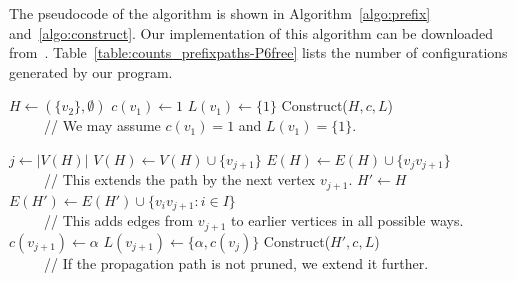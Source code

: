 \documentclass[11pt]{article}
\begin{document}
The pseudocode of the algorithm is shown in Algorithm~\ref{algo:prefix} and~\ref{algo:construct}. 
Our implementation of this algorithm can be downloaded from~\cite{listcriticalpfree-site}. 
Table~\ref{table:counts_prefixpaths-P6free} lists the number of configurations generated by our program.


\begin{algorithm}[h]
\caption{Generate propagation paths and lists}
\label{algo:prefix}
  \begin{algorithmic}[1]
	\STATE $H\gets (\{v_2\},\emptyset)$
	\STATE $c(v_1)\gets 1$
	\STATE $L(v_1)\gets \{1\}$
	\STATE Construct($H,c,L$)\\ ~~~~~// We may assume $c(v_1)=1$ and $L(v_1)=\{1\}$.
  \end{algorithmic}
\end{algorithm}

\begin{algorithm}[ht!]
\caption{Construct(Graph $H$, coloring $c$, list system $L$)}
\label{algo:construct}
  \begin{algorithmic}[1]
		\STATE $j \gets |V(H)|$
		\STATE $V(H)\gets V(H) \cup \{v_{j+1}\}$
		\STATE $E(H)\gets E(H) \cup \{v_{j}v_{j+1}\}$
		\\ ~~~~~// This extends the path by the next vertex $v_{j+1}$.
			\STATE $H' \gets H$
			\STATE $E(H') \gets E(H') \cup \{v_iv_{j+1}: i \in I\}$
			\\ ~~~~~// This adds edges from $v_{j+1}$ to earlier vertices in all possible ways.
			\STATE $c(v_{j+1})\gets \alpha$
			\STATE $L(v_{j+1})\gets \{\alpha,c(v_j)\}$
				\STATE Construct($H',c,L$)
			\\ ~~~~~// If the propagation path is not pruned, we extend it further.
			\ENDIF
		\ENDFOR
  \end{algorithmic}
\end{algorithm}
\end{document}
